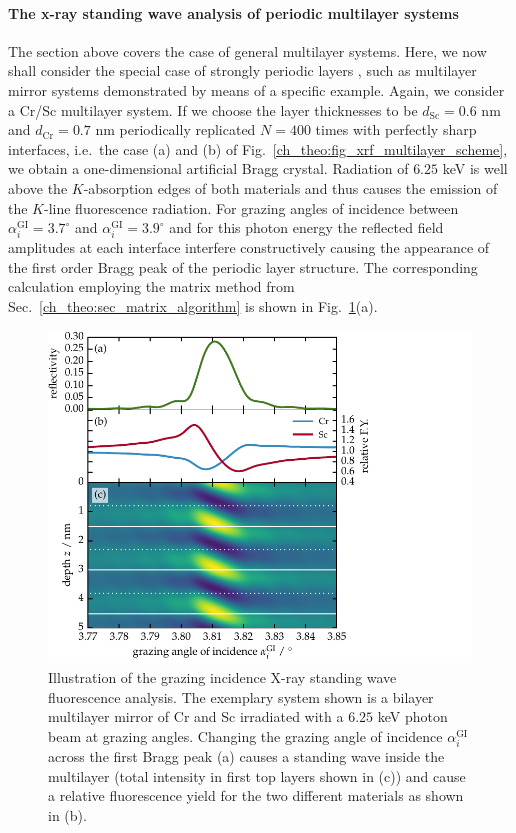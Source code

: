 \paragraph{The x-ray standing wave analysis of periodic multilayer systems}
The section above covers the case of general multilayer systems. Here, we now shall consider the special case of strongly periodic layers \cite{dev_resonance_2000, ghose_x-ray_2001}, such as multilayer mirror systems demonstrated by means of a specific example. Again, we consider a Cr/Sc multilayer system. If we choose the layer thicknesses to be $d_\text{Sc} = 0.6$ nm and $d_\text{Cr} = 0.7$ nm periodically replicated $N=400$ times with perfectly sharp interfaces, i.e.~the case (a) and (b) of Fig.~\ref{ch_theo:fig_xrf_multilayer_scheme}, we obtain a one-dimensional artificial Bragg crystal. Radiation of $6.25$ keV is well above the $K$-absorption edges of both materials and thus causes the emission of the $K$-line fluorescence radiation. For grazing angles of incidence between $\alpha_i^\text{GI} = 3.7^\circ$ and $\alpha_i^\text{GI}=3.9^\circ$ and for this photon energy the reflected field amplitudes at each interface interfere constructively causing the appearance of the first order Bragg peak of the periodic layer structure. The corresponding calculation employing the matrix method from Sec.~\ref{ch_theo:sec_matrix_algorithm} is shown in Fig.~\ref{ch_theo:fig_xrf_scheme}(a).
\begin{figure}[htb]
        \includegraphics{img/XRF_scheme}
        \caption[X-ray standing wave fluorescence principle.]{%
            Illustration of the grazing incidence X-ray standing wave fluorescence analysis. The exemplary system shown is a bilayer multilayer mirror of Cr and Sc irradiated with a $6.25$ keV photon beam at grazing angles. Changing the grazing angle of incidence $\alpha_i^\text{GI}$ across the first Bragg peak (a) causes a standing wave inside the multilayer (total intensity in first top layers shown in (c)) and cause a relative fluorescence yield for the two different materials as shown in (b).}
        \label{ch_theo:fig_xrf_scheme}
\end{figure}

